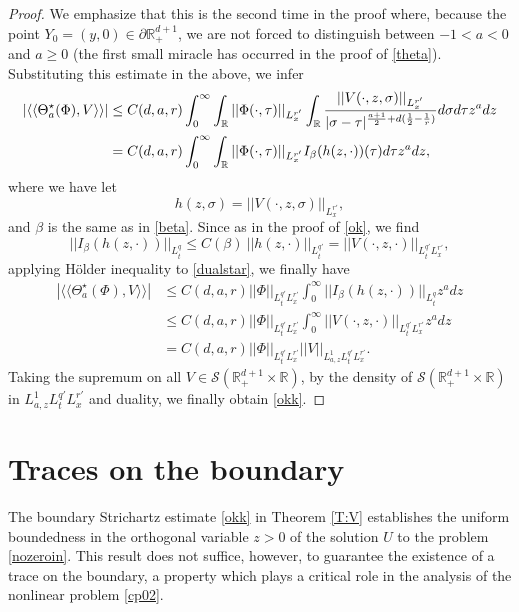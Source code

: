\documentclass[11pt,letter]{amsart}
\def \RN {\mathbb{R}_+^{d+1}}
\def \R {\mathbb{R}}
\newcommand{\p}{\partial}
\numberwithin{equation}{section}
\newcommand{\sa}{\langle}
\newcommand{\da}{\rangle}
\numberwithin{equation}{section}
\begin{document}
\begin{proof}
We emphasize that this is the second time in the proof where, because the point $Y_0 = (y,0)\in \p \RN$, we are not forced to distinguish between $-1<a<0$ and $a\ge 0$ (the first small miracle has occurred in the proof of \eqref{theta}). 
Substituting this estimate in the above, we infer
\begin{align}\label{dualstar}
\left|\sa\sa \Theta_a^\star(\Phi),V\da\da\right| & \le C(d,a,r) \int_0^\infty \int_{\R} ||\Phi(\cdot,\tau)||_{L^{r'}_x}  \int_{\R} \frac{||V(\cdot,z,\sigma)||_{L^{r'}_x}}{|\sigma-\tau|^{\frac{a+1}2+ d(\frac 12 - \frac 1r)}} d\sigma d\tau z^a dz
\\
& = C(d,a,r) \int_0^\infty \int_{\R} ||\Phi(\cdot,\tau)||_{L^{r'}_x} I_\beta(h(z,\cdot))(\tau) d\tau z^a dz,
\notag
\end{align}
where we have let 
\[
h(z,\sigma) = ||V(\cdot,z,\sigma)||_{L^{r'}_x},
\]
and $\beta$ is the same as in \eqref{beta}. Since as in the proof of \eqref{ok}, we find
\[
||I_\beta(h(z,\cdot))||_{L^q_t} \le C(\beta)\ ||h(z,\cdot)||_{L^{q'}_t} = ||V(\cdot,z,\cdot)||_{L^{q'}_t L^{r'}_x},
\]
applying H\"older inequality to \eqref{dualstar}, we finally have
\begin{align*}
\left|\sa\sa \Theta_a^\star(\Phi),V\da\da\right| &  \le C(d,a,r) ||\Phi||_{L^{q'}_t L^{r'}_x} \int_0^\infty ||I_\beta(h(z,\cdot))||_{L^q_t} z^a dz
\\ 
& \le C(d,a,r) ||\Phi||_{L^{q'}_t L^{r'}_x} \int_0^\infty ||V(\cdot,z,\cdot)||_{L^{q'}_t L^{r'}_x} z^a dz
\\
& = C(d,a,r) ||\Phi||_{L^{q'}_t L^{r'}_x} ||V||_{L^1_{a,z} L^{q'}_t L^{r'}_x}.
\end{align*}
Taking the supremum on all $V\in \mathscr S(\RN\times \R)$, by the density of $\mathscr S(\RN\times \R)$ in $L^1_{a,z} L^{q'}_t L^{r'}_x $ and duality,  we finally obtain \eqref{okk}.

\end{proof}

\section{Traces on the boundary}\label{S:cont}

The boundary Strichartz estimate \eqref{okk} in Theorem \ref{T:V} establishes the uniform boundedness in the orthogonal variable $z>0$ of the solution $U$ to the problem \eqref{nozeroin}. This result does not suffice, however, to guarantee the existence of a trace on the boundary, a property which plays a critical role in the analysis of the nonlinear problem \eqref{cp02}. 
\end{document}
